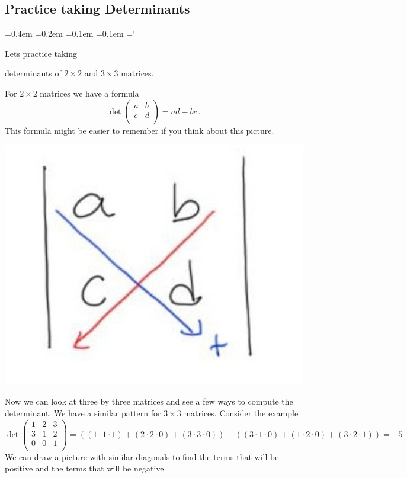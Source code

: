 
\subsection*{Practice taking Determinants}

{\ttfamily
{}\font=0.4em
\font=0.2em
\font=0.1em
\font=0.1em
\hyphenchar\font=`\-





\hypertarget{video_properties_of_determinant_practice}{Lets practice taking} determinants of $2 \times 2$ and $3\times 3$ matrices. 

For $2 \times 2$ matrices we have a formula
\[
\det
\begin{pmatrix}
a & b \\
c & d \\
\end{pmatrix}
= ad - bc\, .
\]
This formula might be easier to remember if you think about this picture.
\begin{center}
\includegraphics[scale=.20]{determinant_2by2.jpg}
\end{center}

Now we can look at three by three matrices and see a few ways to compute the determinant. We have a similar pattern for $3\times 3$ matrices. 
Consider the example 
\[
\det
\begin{pmatrix}
1 & 2 & 3 \\
3 & 1 & 2 \\
0 & 0 & 1 \\
\end{pmatrix}
= ( (1\cdot 1\cdot 1)+ (2\cdot 2\cdot 0) + (3\cdot 3\cdot 0)) - ((3\cdot 1\cdot 0)+ (1\cdot 2\cdot 0) + (3\cdot 2\cdot 1)) = -5
\]
We can draw a picture with similar diagonals to find the terms that will be positive and the terms that will be negative.

}
